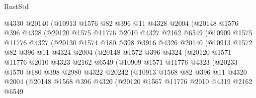 \begin{lexlean}{RustStd}
\begin{coremodule}
              @4330
              @20140
              (@10913
                @1576
                @82
                @396
                @11
                @4328
                @2004
                (@20148
                  @1576
                  @396
                  @4328
                  (@20120
                    @1575
                    @11776
                    @2010
                    @4327
                    @2162
                    @6549
                    (@10909
                      @1575
                      @11776
                      @4327
                      (@20130
                        @1574
                        @180
                        @398
                        @3916
                        @4326
                        @20140
                        (@10913
                          @1572
                          @82
                          @396
                          @11
                          @4324
                          @2004
                          (@20148
                            @1572
                            @396
                            @4324
                            (@20120
                              @1571
                              @11776
                              @2010
                              @4323
                              @2162
                              @6549
                              (@10909
                                @1571
                                @11776
                                @4323
                                (@20233
                                  @1570
                                  @180
                                  @398
                                  @2980
                                  @4322
                                  @20242
                                  (@10913
                                    @1568
                                    @82
                                    @396
                                    @11
                                    @4320
                                    @2004
                                    (@20148
                                      @1568
                                      @396
                                      @4320
                                      (@20120
                                        @1567
                                        @11776
                                        @2010
                                        @4319
                                        @2162
                                        @6549

\end{coremodule}
\end{lexlean}
